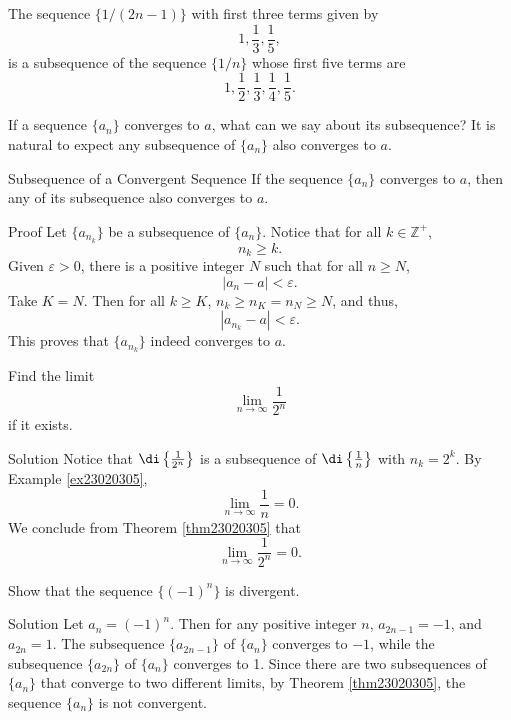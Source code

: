 \begin{example}{}
The sequence $\{1/(2n-1)\}$ with first three terms given by 
\[1, \frac{1}{3}, \frac{1}{5},\]
is a subsequence of the sequence $\{1/n\}$ whose first five terms are
\[1, \frac{1}{2}, \frac{1}{3}, \frac{1}{4}, \frac{1}{5}.\]
\end{example}

If a sequence $\{a_n\}$ converges to $a$, what can we say about its subsequence? It is natural to expect any subsequence of $\{a_n\}$ also converges to $a$.

\begin{theorem}[label=thm23020305]{Subsequence of a Convergent Sequence}
If the sequence $\{a_n\}$ converges to $a$, then any of its subsequence also converges to $a$.
\end{theorem}
\begin{myproof}{Proof}
Let $\{a_{n_k}\}$ be a subsequence of $\{a_n\}$. Notice that for all $k\in\mathbb{Z}^+$, 
\[n_k\geq k.\]
Given $\varepsilon>0$, there is a positive integer $N$ such that for all $n\geq N$,
\[|a_n-a|<\varepsilon.\]
Take $K=N$. Then for all $k\geq K$, $n_k\geq n_K=n_N\geq  N$, and thus,
\[|a_{n_k}-a|<\varepsilon.\] This proves that $\{a_{n_k}\}$ indeed converges to $a$.
\end{myproof}

\begin{example}
{}
Find the limit 
\[\lim_{n\rightarrow\infty}\frac{1}{2^n}\] if it exists.
\end{example}
\begin{solution}{Solution}
Notice that $\di\left\{\frac{1}{2^n}\right\}$ is a subsequence of $\di\left\{\frac{1}{n}\right\}$ with $n_k=2^k$. By Example \ref{ex23020305}, 
\[\lim_{n\rightarrow\infty}\frac{1}{n}=0.\] We conclude from Theorem \ref{thm23020305} that \[\lim_{n\rightarrow\infty}\frac{1}{2^n}=0.\]
\end{solution}

\begin{example}{}
Show that the sequence $\{(-1)^n\}$ is divergent.
\end{example}
\begin{solution}{Solution}
Let $a_n=(-1)^n$. Then  for any positive integer $n$, $a_{2n-1}=-1$, and $a_{2n}=1$. The subsequence $\{a_{2n-1}\}$ of $\{a_n\}$ converges to $-1$, while the subsequence  $\{a_{2n}\}$ of $\{a_n\}$ converges to 1. Since there are two subsequences of $\{a_n\}$ that converge to two different limits, by Theorem \ref{thm23020305}, the sequence $\{a_n\}$ is not convergent.
\end{solution}

